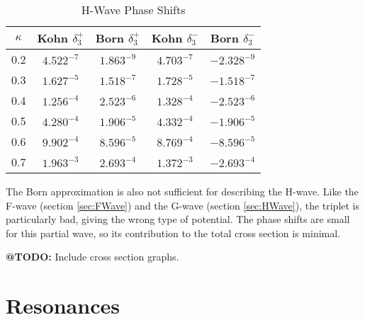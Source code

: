 \documentclass[Dissertation.tex]{subfiles}
\begin{document}
\setlength{\abovecaptionskip}{6pt}
\setlength{\belowcaptionskip}{6pt}
\begin{table}[H]
\centering
\begin{tabular}{c | c c | c c}
\toprule
$\kappa$ & Kohn $\delta_3^+$ & Born $\delta_3^+$ & Kohn $\delta_3^-$ & Born $\delta_3^-$ \\
\midrule
0.2 &	$4.522^{-7}$ & $1.863^{-9}$ & $4.703^{-7}$ & $-2.328^{-9}$ \\
0.3 &	$1.627^{-5}$ & $1.518^{-7}$ & $1.728^{-5}$ & $-1.518^{-7}$ \\
0.4 &	$1.256^{-4}$ & $2.523^{-6}$ & $1.328^{-4}$ & $-2.523^{-6}$ \\
0.5 &	$4.280^{-4}$ & $1.906^{-5}$ & $4.332^{-4}$ & $-1.906^{-5}$ \\
0.6 &	$9.902^{-4}$ & $8.596^{-5}$ & $8.769^{-4}$ & $-8.596^{-5}$ \\
0.7 &	$1.963^{-3}$ & $2.693^{-4}$ & $1.372^{-3}$ & $-2.693^{-4}$ \\
\bottomrule
\end{tabular}
\caption{H-Wave Phase Shifts}
\label{tab:HWavePhase}
\end{table}

The Born approximation is also not sufficient for describing the H-wave. Like the F-wave (section \ref{sec:FWave}) and the G-wave (section \ref{sec:HWave}), the triplet is particularly bad, giving the wrong type of potential. The phase shifts are small for this partial wave, so its contribution to the total cross section is minimal.

\textbf{@TODO:} Include cross section graphs.


\section{Resonances}
\label{sec:AllResonances}
\end{document}
